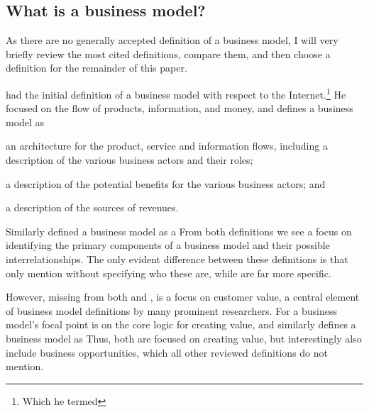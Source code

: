 \subsection{What is a business model?}
\label{section:businessmodels:what}

As there are no generally accepted definition of a business model, I will very briefly review the most cited definitions, compare them, and then choose a definition for the remainder of this paper.

\citet{timmers1998} had the initial definition of a business model with respect to the Internet.\footnote{Which he termed } He focused on the flow of products, information, and money, and defines a business model as
\begin{enump}
  \item an architecture for the product, service and information flows, including a description of the various business actors and their roles; 
  \item a description of the potential benefits for the various business actors; and 
  \item a description of the sources of revenues.
\end{enump} Similarly \citet[]{weill2001} defined a business model as a  From both definitions we see a focus on identifying the primary components of a business model and their possible interrelationships. The only evident difference between these definitions is that \citet{timmers1998} only mention  without specifying who these are, while \citet{weill2001} are far more specific. 

However, missing from both \citet{weill2001} and \citet{timmers1998}, is a focus on customer value, a central element of business model definitions by many prominent researchers. For \citet{linder2000} a business model's focal point is on the core logic for creating value, and similarly \citet[]{amit2001} defines a business model as  Thus, both are focused on creating value, but interestingly \citet{amit2001} also include business opportunities, which all other reviewed definitions do not mention. 

